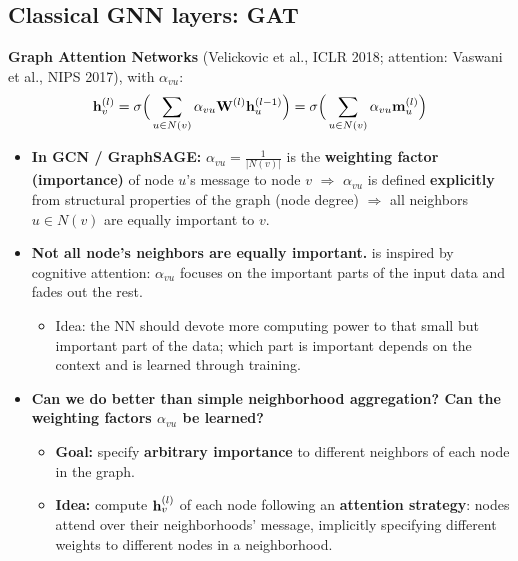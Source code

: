 \subsection{Classical GNN layers: GAT}\label{sec:lec04-gat}

\textbf{Graph Attention Networks} (Velickovic et al., ICLR 2018; attention:
Vaswani et al., NIPS 2017), with  $\alpha_{vu}$:
\begin{equation}\label{eq:lec04-gat}
  \mathbf{h}_v^{(l)} = \sigma\Big(\sum_{u\in N(v)}\alpha_{vu}\mathbf{W}^{(l)}\mathbf{h}_u^{(l-1)}\Big)
  = \sigma\Big(\sum_{u\in N(v)}\alpha_{vu}\mathbf{m}_u^{(l)}\Big)
\end{equation}
\begin{itemize}
  \item \textbf{In GCN / GraphSAGE:} $\alpha_{vu}=\frac{1}{|N(v)|}$ is the
    \textbf{weighting factor (importance)} of node $u$'s message to node $v$
    $\Rightarrow$ $\alpha_{vu}$ is defined \textbf{explicitly} from structural
    properties of the graph (node degree) $\Rightarrow$ all neighbors $u\in
    N(v)$ are equally important to $v$.
  \item \textbf{Not all node's neighbors are equally important.}
     is inspired by cognitive attention: $\alpha_{vu}$ focuses on
    the important parts of the input data and fades out the rest.
    \begin{itemize}
      \item Idea: the NN should devote more computing power to that small but
        important part of the data; which part is important depends on the
        context and is learned through training.
    \end{itemize}
  \item \textbf{Can we do better than simple neighborhood aggregation? Can the
    weighting factors $\alpha_{vu}$ be learned?}
    \begin{itemize}
      \item \textbf{Goal:} specify \textbf{arbitrary importance} to different
        neighbors of each node in the graph.
      \item \textbf{Idea:} compute $\mathbf{h}_v^{(l)}$ of each node following an
        \textbf{attention strategy}: nodes attend over their neighborhoods'
        message, implicitly specifying different weights to different nodes in
        a neighborhood.
    \end{itemize}
\end{itemize}


